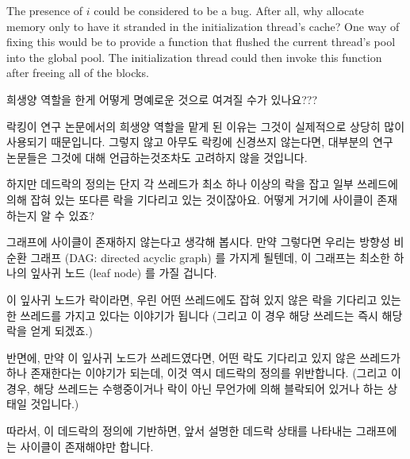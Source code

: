 \begin{enumerate}
	The presence of $i$ could be considered to be a bug.
	After all, why allocate memory only to have it stranded in
	the initialization thread's cache?
	One way of fixing this would be to provide a 
	function that flushed the current thread's pool into the
	global pool.
	The initialization thread could then invoke this function
	after freeing all of the blocks.
	\fi

\QuickQ{}
	희생양 역할을 한게 어떻게 명예로운 것으로 여겨질 수가 있나요???

\QuickA{}
	락킹이 연구 논문에서의 희생양 역할을 맡게 된 이유는 그것이 실제적으로
	상당히 많이 사용되기 때문입니다.
	그렇지 않고 아무도 락킹에 신경쓰지 않는다면, 대부분의 연구 논문들은
	그것에 대해 언급하는것조차도 고려하지 않을 것입니다.

\QuickQ{}
	하지만 데드락의 정의는 단지 각 쓰레드가 최소 하나 이상의 락을 잡고 일부
	쓰레드에 의해 잡혀 있는 또다른 락을 기다리고 있는 것이잖아요.
	어떻게 거기에 사이클이 존재하는지 알 수 있죠?

\QuickA{}
	그래프에 사이클이 존재하지 않는다고 생각해 봅시다.
	만약 그렇다면 우리는 방향성 비순환 그래프 (DAG: directed acyclic graph)
	를 가지게 될텐데, 이 그래프는 최소한 하나의 잎사귀 노드 (leaf node) 를
	가질 겁니다.

	이 잎사귀 노드가 락이라면, 우린 어떤 쓰레드에도 잡혀 있지 않은 락을
	기다리고 있는 한 쓰레드를 가지고 있다는 이야기가 됩니다
	(그리고 이 경우 해당 쓰레드는 즉시 해당 락을 얻게 되겠죠.)

	반면에, 만약 이 잎사귀 노드가 쓰레드였다면, 어떤 락도 기다리고 있지
	않은 쓰레드가 하나 존재한다는 이야기가 되는데, 이것 역시 데드락의
	정의를 위반합니다.
	(그리고 이 경우, 해당 쓰레드는 수행중이거나 락이 아닌 무언가에 의해
	블락되어 있거나 하는 상태일 것입니다.)

	따라서, 이 데드락의 정의에 기반하면, 앞서 설명한 데드락 상태를 나타내는
	그래프에는 사이클이 존재해야만 합니다.
	\iffalse


\end{enumerate}

